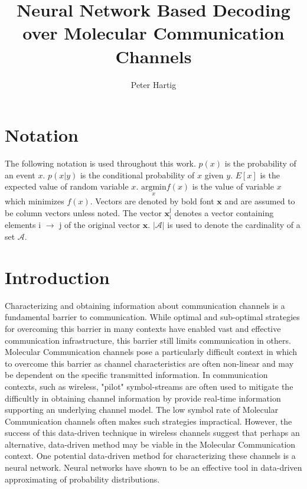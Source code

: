 \documentclass[12pt,a4paper]{report}
\title{Neural Network Based Decoding over Molecular Communication Channels}
\author{Peter Hartig}
\begin{document}
\maketitle

\begin{abstract}

\end{abstract}

\newpage
\tableofcontents
\newpage
\section{Notation}
The following notation is used throughout this work.
$p(x)$ is the probability of an event $x$.
$p(x|y)$ is the conditional probability of $x$ given $y$.
$E[x]$ is the expected value of random variable $x$.
$\underset{x}{\text{argmin}} f(x)$ is the value of variable $x$ which minimizes $f(x)$.
Vectors  are denoted by bold font $\mathbf{x}$ and are assumed to be column vectors unless noted.
The vector $\mathbf{x}_{\mathrm{i}}^{\mathrm{j}}$ denotes a vector containing elements i $\rightarrow$ j of the original vector $\mathbf{x}$. $|\mathcal{A}|$ is used to denote the cardinality of a set $\mathcal{A}$.

\section{Introduction}
Characterizing and obtaining information about communication channels is a fundamental barrier to communication. While optimal and sub-optimal strategies for overcoming this barrier in many contexts have enabled vast and effective communication infrastructure, this barrier still limits communication in others. Molecular Communication channels pose a particularly difficult context in which to overcome this barrier as channel characteristics are often non-linear and may be dependent on the specific transmitted information.
In communication contexts, such as wireless, "pilot" symbol-streams are often used to mitigate the difficultly in obtaining channel information by provide real-time information supporting an underlying channel model. The low symbol rate of Molecular Communication channels often makes such strategies impractical. However, the success of this data-driven technique in wireless channels suggest that perhaps an alternative, data-driven method may be viable in the Molecular Communication context. One potential data-driven method for characterizing these channels is a neural network. Neural networks have shown to be an effective tool in data-driven approximating of probability distributions.
\par
\end{document}
